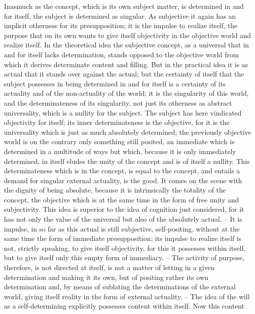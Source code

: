 Inasmuch as the concept, which is its own subject matter, is determined in
and for itself, the subject is determined as singular. As subjective it again has
an implicit otherness for its presupposition; it is the impulse to realize itself,
the purpose that on its own wants to give itself objectivity in the objective
world and realize itself. In the theoretical idea the subjective concept, as a
universal that in and for itself lacks determination, stands opposed to the
objective world from which it derives determinate content and filling. But
in the practical idea it is as actual that it stands over against the actual;
but the certainty of itself that the subject possesses in being determined
in and for itself is a certainty of its actuality and of the non-actuality of
the world; it is the singularity of this world, and the determinateness of its
singularity, not just its otherness as abstract universality, which is a nullity
for the subject. The subject has here vindicated objectivity for itself; its
inner determinateness is the objective, for it is the universality which is just
as much absolutely determined; the previously objective world is on the
contrary only something still posited, an immediate which is determined in
a multitude of ways but which, because it is only immediately determined,
in itself eludes the unity of the concept and is of itself a nullity.
This determinateness which is in the concept, is equal to the concept,
and entails a demand for singular external actuality, is the good. It comes
on the scene with the dignity of being absolute, because it is intrinsically
the totality of the concept, the objective which is at the same time in the
form of free unity and subjectivity. This idea is superior to the idea of
cognition just considered, for it has not only the value of the universal but
also of the absolutely actual. – It is impulse, in so far as this actual is still
subjective, self-positing, without at the same time the form of immediate
presupposition; its impulse to realize itself is not, strictly speaking, to give
itself objectivity, for this it possesses within itself, but to give itself only
this empty form of immediacy. – The activity of purpose, therefore, is
not directed at itself, is not a matter of letting in a given determination
and making it its own, but of positing rather its own determination and,
by means of sublating the determinations of the external world, giving
itself reality in the form of external actuality. – The idea of the will as a
self-determining explicitly possesses content within itself. Now this content
